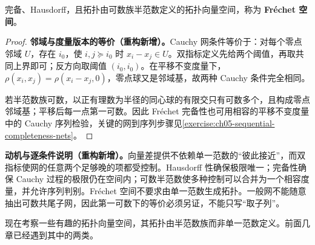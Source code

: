 \documentclass[../../main.tex]{subfiles}
\begin{document}
\begin{definition}[Fr\'echet 空间]\label{definition:ch05-frechet}
完备、Hausdorff，且拓扑由可数族半范数定义的拓扑向量空间，称为 \textbf{Fr\'echet 空间}。
\end{definition}
\begin{proof}
\textbf{邻域与度量版本的等价（重构新增）。}Cauchy 网条件等价于：对每个零点邻域 $U$，存在 $i_0$，使 $i,j\succeq i_0$ 时 $x_i-x_j\in U$。双指标定义先给两个阈值，再取共同上界即可；反方向取阈值 $(i_0,i_0)$。在平移不变度量下，$\rho(x_i,x_j)=\rho(x_i-x_j,0)$，零点球又是邻域基，故两种 Cauchy 条件完全相同。

若半范数族可数，以正有理数为半径的同心球的有限交只有可数多个，且构成零点邻域基；平移后每一点第一可数。因此 Fr\'echet 完备性也可用相容的平移不变度量中的 Cauchy 序列检验，关键的网到序列步骤见\cref{exercise:ch05-sequential-completeness-nets}。
\end{proof}
\begin{remark}
\textbf{动机与逐条件说明（重构新增）。}向量差提供不依赖单一范数的“彼此接近”，而双指标使网的任意两个足够晚的项都受控制。Hausdorff 性确保极限唯一；完备性确保 Cauchy 过程的极限仍在空间内；可数半范数使多种控制可以合并为一个相容度量，并允许序列判别。Fr\'echet 空间不要求由单一范数生成拓扑。一般网不能随意抽出可数共尾子网，因此第一可数下的等价必须另证，不能只写“取子列”。
\end{remark}
现在考察一些有趣的拓扑向量空间，其拓扑由半范数族而非单一范数定义。前面几章已经遇到其中的两类。
\end{document}
